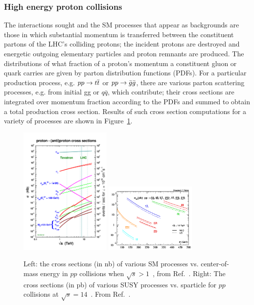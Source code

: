 \subsubsection{High energy proton collisions}
The interactions sought and the SM processes that appear as backgrounds are those in 
which substantial momentum is transferred between the constituent partons of the LHC's 
colliding protons; the incident protons are destroyed and energetic outgoing elementary 
particles and proton remnants are produced. The distributions of what fraction of a 
proton's momentum a constituent gluon or quark carries are given by parton distribution 
functions (PDFs). For a particular production process, e.g. $pp \rightarrow \relax{t}\overline{\relax{t}}$ or 
$pp \rightarrow \bar{g}\bar{g}$, there are various parton scattering processes, e.g. 
from initial gg or $q\bar{q}$, which contribute; their cross sections are integrated over momentum fraction according to 
the PDFs and summed to obtain a total production cross section.
Results of such cross section computations for a variety of processes are shown
in Figure~\ref{fig:crossSec}.

\begin{figure}[h!]
  \begin{center}
      \includegraphics[width=0.40\textwidth,trim=0 2cm 0 0]{figures/crosssections2012_v5}
      \includegraphics[width=0.40\textwidth,]{figures/PEacs.png}
      \caption{\label{fig:crossSec} Left: the cross sections (in nb) of various SM processes vs. center-of-mass
              energy in $pp$ collisions when $\sqrt{s}>1$~\TeV, from Ref.~\cite{stirling-xs}. Right: 
              The cross sections (in pb) of various SUSY processes vs. sparticle for $pp$ collisions
              at $\sqrt{s}=14$~\TeV. From Ref.~\cite{Beenakker:1996ed}.} 
  \end{center}
\end{figure}

